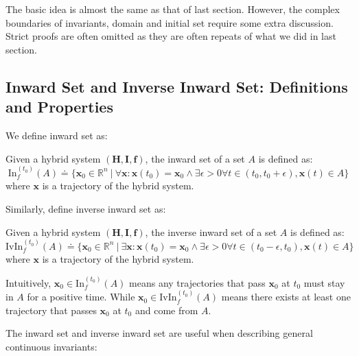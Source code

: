 \documentclass{article}
\begin{document}
The basic idea is almost the same as that of last section. However, the complex boundaries of invariants, domain and initial set require some extra discussion. Strict proofs are often omitted as they are often repeats of what we did in last section.

\subsection{Inward Set and Inverse Inward Set: Definitions and Properties}
We define inward set as:
\begin{Definition}
\label{def:in}
Given a hybrid system $(\boldsymbol{H}, \boldsymbol{I}, \boldsymbol{f})$, the inward set of a set $A$ is defined as: 
\begin{equation*}
	\mathrm{In}_f^{(t_0)}(A) \doteq \{ \boldsymbol{x}_0 \in \mathbb{R}^n\ |\ \forall \boldsymbol{x}: \boldsymbol{x}(t_0) = \boldsymbol{x}_0 \wedge \exists \epsilon > 0 \forall t \in (t_0, t_0 + \epsilon), \boldsymbol{x}(t) \in A \}
\end{equation*}
where $\boldsymbol{x}$ is a trajectory of the hybrid system.
\end{Definition}

Similarly, define inverse inward set as:
\begin{Definition}
\label{def:ivin}
Given a hybrid system $(\boldsymbol{H}, \boldsymbol{I}, \boldsymbol{f})$, the inverse inward set of a set $A$ is defined as: 
\begin{equation*}
	\mathrm{IvIn}_f^{(t_0)}(A) \doteq \{ \boldsymbol{x}_0 \in \mathbb{R}^n\ |\ \exists \boldsymbol{x}: \boldsymbol{x}(t_0) = \boldsymbol{x}_0 \wedge \exists \epsilon > 0 \forall t \in (t_0 - \epsilon, t_0), \boldsymbol{x}(t) \in A \}
\end{equation*}
where $\boldsymbol{x}$ is a trajectory of the hybrid system.
\end{Definition}

Intuitively, $\boldsymbol{x}_0 \in \mathrm{In}_f^{(t_0)}(A)$ means any trajectories that pass $\boldsymbol{x}_0$ at $t_0$ must stay in $A$ for a positive time. While $\boldsymbol{x}_0 \in \mathrm{IvIn}_f^{(t_0)}(A)$ means there exists at least one trajectory that passes $\boldsymbol{x}_0$ at $t_0$ and come from $A$.

The inward set and inverse inward set are useful when describing general continuous invariants: 
\end{document}
